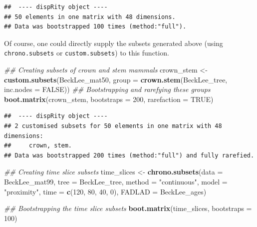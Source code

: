 \documentclass[
]{book}
\newenvironment{Shaded}{\begin{snugshade}}{\end{snugshade}}
\newcommand{\CommentTok}[1]{\textcolor[rgb]{0.56,0.35,0.01}{\textit{#1}}}
\newcommand{\DataTypeTok}[1]{\textcolor[rgb]{0.13,0.29,0.53}{#1}}
\newcommand{\DecValTok}[1]{\textcolor[rgb]{0.00,0.00,0.81}{#1}}
\newcommand{\KeywordTok}[1]{\textcolor[rgb]{0.13,0.29,0.53}{\textbf{#1}}}
\newcommand{\NormalTok}[1]{#1}
\newcommand{\OtherTok}[1]{\textcolor[rgb]{0.56,0.35,0.01}{#1}}
\newcommand{\StringTok}[1]{\textcolor[rgb]{0.31,0.60,0.02}{#1}}
\begin{document}
\begin{verbatim}
##  ---- dispRity object ---- 
## 50 elements in one matrix with 48 dimensions.
## Data was bootstrapped 100 times (method:"full").
\end{verbatim}

Of course, one could directly supply the subsets generated above (using \texttt{chrono.subsets} or \texttt{custom.subsets}) to this function.

\begin{Shaded}
\begin{Highlighting}[]
\CommentTok{\#\# Creating subsets of crown and stem mammals}
\NormalTok{crown\_stem \textless{}{-}}\StringTok{ }\KeywordTok{custom.subsets}\NormalTok{(BeckLee\_mat50,}
                             \DataTypeTok{group =} \KeywordTok{crown.stem}\NormalTok{(BeckLee\_tree,}
                                                \DataTypeTok{inc.nodes =} \OtherTok{FALSE}\NormalTok{))}
\CommentTok{\#\# Bootstrapping and rarefying these groups}
\KeywordTok{boot.matrix}\NormalTok{(crown\_stem, }\DataTypeTok{bootstraps =} \DecValTok{200}\NormalTok{, }\DataTypeTok{rarefaction =} \OtherTok{TRUE}\NormalTok{)}
\end{Highlighting}
\end{Shaded}

\begin{verbatim}
##  ---- dispRity object ---- 
## 2 customised subsets for 50 elements in one matrix with 48 dimensions:
##     crown, stem.
## Data was bootstrapped 200 times (method:"full") and fully rarefied.
\end{verbatim}

\begin{Shaded}
\begin{Highlighting}[]
\CommentTok{\#\# Creating time slice subsets}
\NormalTok{time\_slices \textless{}{-}}\StringTok{ }\KeywordTok{chrono.subsets}\NormalTok{(}\DataTypeTok{data =}\NormalTok{ BeckLee\_mat99,}
                              \DataTypeTok{tree =}\NormalTok{ BeckLee\_tree, }
                              \DataTypeTok{method =} \StringTok{"continuous"}\NormalTok{,}
                              \DataTypeTok{model =} \StringTok{"proximity"}\NormalTok{, }
                              \DataTypeTok{time =} \KeywordTok{c}\NormalTok{(}\DecValTok{120}\NormalTok{, }\DecValTok{80}\NormalTok{, }\DecValTok{40}\NormalTok{, }\DecValTok{0}\NormalTok{),}
                              \DataTypeTok{FADLAD =}\NormalTok{ BeckLee\_ages)}

\CommentTok{\#\# Bootstrapping the time slice subsets}
\KeywordTok{boot.matrix}\NormalTok{(time\_slices, }\DataTypeTok{bootstraps =} \DecValTok{100}\NormalTok{)}
\end{Highlighting}
\end{Shaded}
\end{document}

